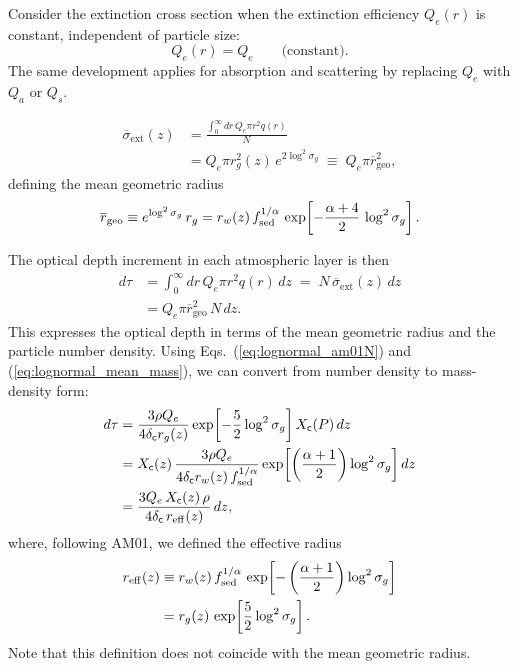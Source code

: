 Consider the extinction cross section when the extinction efficiency $Q_e(r)$ is constant, independent of particle size:
\begin{equation}
    Q_e (r) = Q_e \qquad \text{(constant)}.
\end{equation}
The same development applies for absorption and scattering by replacing $Q_e$ with $Q_a$ or $Q_s$.

\begin{align}
\overline{\sigma}_\mathrm{ext}(z) &= \frac{\int_0^\infty dr \, Q_e \pi r^2 q(r)}{N} \\
&=  Q_e \pi r_g^2(z)\, e^{2\log^2{\sigma_g}} \;\equiv\; Q_e \pi \overline{r}_\mathrm{geo}^2,
\end{align}
defining the mean geometric radius
\begin{align}
\overline{r}_\mathrm{geo} \equiv e^{\log^2{\sigma_g}}\, r_g 
= r_w(z)\, f_\mathrm{sed}^{1/\alpha}\, \exp\!\left[-\frac{\alpha+4}{2}\, \log^2{\sigma_g}\right].
\end{align}

The optical depth increment in each atmospheric layer is then
\begin{align}
d \tau &= \int_0^\infty dr \, Q_e \pi r^2 q(r)\, dz \;=\; N\, \overline{\sigma}_\mathrm{ext}(z)\, dz \\
&= Q_e \pi \overline{r}_\mathrm{geo}^2\, N\, dz.
\end{align}
This expresses the optical depth in terms of the mean geometric radius and the particle number density.  
Using Eqs.~(\ref{eq:lognormal_am01N}) and (\ref{eq:lognormal_mean_mass}), we can convert from number density to mass-density form:
\begin{align}
\label{eq:dtaucloud0}
d \tau &= \frac{3  \rho Q_e }{4 \delta_{\mathsf{c}} r_g(z)} 
\exp\!\left[ - \frac{5}{2} \log^2{\sigma_g} \right]  X_{\mathsf{c}} (P)\, dz \\
&= X_{\mathsf{c}}  (z)\, \frac{3 \rho Q_e }{4 \delta_{\mathsf{c}} r_w(z)\, f_\mathrm{sed}^{1/\alpha}}  
\exp\!\left[ \left( \frac{\alpha + 1}{2} \right) \log^2{\sigma_g} \right] dz \\
\label{eq:dtaucloud1}
&= \frac{3 Q_e\, X_{\mathsf{c}}  (z)\, \rho}{4 \delta_{\mathsf{c}}\, r_\mathrm{eff}(z)} \, dz,
\end{align}
where, following AM01, we defined the effective radius
\begin{align}
r_\mathrm{eff}(z) &\equiv r_w(z)\, f_\mathrm{sed}^{1/\alpha}\, \exp\!\left[ - \left( \frac{\alpha + 1}{2} \right) \log^2{\sigma_g} \right] \\
&= r_g(z)\, \exp\!\left[ \frac{5}{2} \log^2{\sigma_g} \right].
\end{align}
Note that this definition does not coincide with the mean geometric radius.

